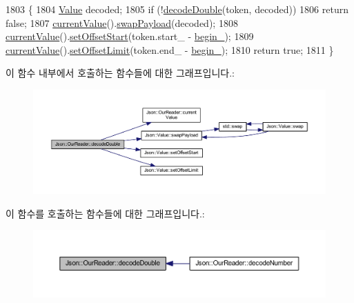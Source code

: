 \begin{DoxyCode}
1803                                          \{
1804   \hyperlink{class_json_1_1_value}{Value} decoded;
1805   \textcolor{keywordflow}{if} (!\hyperlink{class_json_1_1_our_reader_a1d1c3b44f6720a0e7c39b5ae8de3981c}{decodeDouble}(token, decoded))
1806     \textcolor{keywordflow}{return} \textcolor{keyword}{false};
1807   \hyperlink{class_json_1_1_our_reader_a2acd5b1d53e7d7e17c21ff8e96edc09d}{currentValue}().\hyperlink{class_json_1_1_value_a5263476047f20e2fc6de470e4de34fe5}{swapPayload}(decoded);
1808   \hyperlink{class_json_1_1_our_reader_a2acd5b1d53e7d7e17c21ff8e96edc09d}{currentValue}().\hyperlink{class_json_1_1_value_a92e32ea0f4f8a15853a3cf0beac9feb9}{setOffsetStart}(token.start\_ - \hyperlink{class_json_1_1_our_reader_a9bda9d72335d52cd06e65f9eca3f70f5}{begin\_});
1809   \hyperlink{class_json_1_1_our_reader_a2acd5b1d53e7d7e17c21ff8e96edc09d}{currentValue}().\hyperlink{class_json_1_1_value_a5e4f5853fec138150c5df6004a8c2bcf}{setOffsetLimit}(token.end\_ - \hyperlink{class_json_1_1_our_reader_a9bda9d72335d52cd06e65f9eca3f70f5}{begin\_});
1810   \textcolor{keywordflow}{return} \textcolor{keyword}{true};
1811 \}
\end{DoxyCode}
이 함수 내부에서 호출하는 함수들에 대한 그래프입니다.\+:\nopagebreak
\begin{figure}[H]
\begin{center}
\leavevmode
\includegraphics[width=350pt]{class_json_1_1_our_reader_a1d1c3b44f6720a0e7c39b5ae8de3981c_cgraph}
\end{center}
\end{figure}
이 함수를 호출하는 함수들에 대한 그래프입니다.\+:\nopagebreak
\begin{figure}[H]
\begin{center}
\leavevmode
\includegraphics[width=350pt]{class_json_1_1_our_reader_a1d1c3b44f6720a0e7c39b5ae8de3981c_icgraph}
\end{center}
\end{figure}
\mbox{\label{class_json_1_1_our_reader_aa5c15a8cd32754f07430dedba3d1308e}} 
